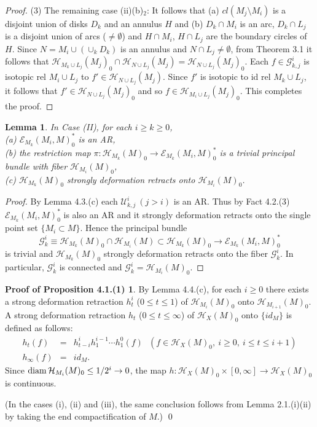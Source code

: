 \documentclass[11pt]{amsart}
\newtheorem{lemma}{Lemma}[section]
\theoremstyle{definition}
\newtheorem*{Proof of Theorem 3.1}{Proof of Theorem 3.1}
\newtheorem*{Proof of Corollary 3.1}{Proof of Corollary 3.1}
\newtheorem*{Proof of Proposition 4.1.(1)}{Proof of Proposition 4.1.(1)}
\newtheorem*{Proof of Proposition 4.1.(2)}{Proof of Proposition 4.1.(2)}
\newtheorem*{Proof of Corollary 1.1}{Proof of Corollary 1.1}
\def \cal {\mathcal}
\begin{document}
\begin{proof}
(3) The remaining case (ii)(b)$_2$: 
It follows that (a) $cl(M_j \setminus M_i)$ is a disjoint union of disks $D_k$ and an annulus $H$ and (b) $D_k \cap M_i$ is an arc, $D_k \cap L_j$ is a disjoint union of arcs ($\neq \emptyset$) and $H \cap M_i$, $H \cap L_j$ are the boundary circles of $H$. Since $N = M_i \cup (\cup_k D_k)$ is an annulus and $N \cap L_j \neq \emptyset$, from Theorem 3.1 it follows that ${\cal H}_{M_k \cup L_j}(M_j)_0 \cap {\cal H}_{N \cup L_j}(M_j) = {\cal H}_{N \cup L_j}(M_j)_0$. Each $f \in {\cal G}^i_{k,j}$ is isotopic rel $M_i \cup L_j$ to $f' \in {\cal H}_{N \cup L_j}(M_j)$. Since $f'$ is isotopic to id rel $M_k \cup L_j$, it follows that $f' \in {\cal H}_{N \cup L_j}(M_j)_0$ and so $f \in {\cal H}_{M_i \cup L_j}(M_j)_0$. This completes the proof.
\end{proof}

\begin{lemma}
In Case {\rm (II)}, for each $i \geq k \geq 0$, \\
{\rm (a)} ${\cal E}_{M_k}(M_i, M)^{\ast}_0$ is an AR, \\ 
{\rm (b)} the restriction map 
$\pi : {\cal H}_{M_k}(M)_0 \longrightarrow {\cal E}_{M_k}(M_i, M)^{\ast}_0$ 
is a trivial principal bundle with fiber ${\cal H}_{M_i}(M)_0$, \\
{\rm (c)} ${\cal H}_{M_k}(M)_0$ strongly deformation retracts onto ${\cal H}_{M_i}(M)_0$. 
\end{lemma}

\begin{proof}
By Lemma 4.3.(c) each ${\cal U}^i_{k,j} \ (j > i)$ is an AR. Thus by Fact 4.2.(3) ${\cal E}_{M_k}(M_i, M)^{\ast}_0$ is also an AR and it strongly deformation retracts onto the single point set $\{ M_i \subset M \}$. Hence the principal bundle 
\[ {\cal G}_k^i \equiv {\cal H}_{M_k}(M)_0 \cap {\cal H}_{M_i}(M) \subset {\cal H}_{M_k}(M)_0 \longrightarrow {\cal E}_{M_k}(M_i, M)^{\ast}_0 \] 
is trivial and ${\cal H}_{M_k}(M)_0$ strongly deformation retracts onto the fiber ${\cal G}_k^i$. In particular, ${\cal G}_k^i$ is connected and ${\cal G}_k^i = {\cal H}_{M_i}(M)_0$.
\end{proof}

\begin{Proof of Proposition 4.1.(1)} 
By Lemma 4.4.(c), for each $i \geq 0$ there exists a strong deformation retraction $h^i_t$ ($0 \leq t \leq 1$) of ${\cal H}_{M_i}(M)_0$ onto ${\cal H}_{M_{i+1}}(M)_0$. A strong deformation retraction $h_t$ ($0 \leq t \leq \infty$) of ${\cal H}_X(M)_0$ onto $\{ id_M \}$ is defined as follows:
\begin{eqnarray*}
 h_t(f) \, &=& h_{t-i}^ih_1^{i-1} \cdots h_1^0(f) \ \ \ (f \in {\cal H}_X(M)_0, \ i \geq 0, \ i \leq t \leq i+1) \\
 h_\infty(f) &=& id_M.
\end{eqnarray*}
Since ${\rm diam} \, {\cal H}_{M_i}(M)_0 \leq 1/2^i \to 0$, the map $h : {\cal H}_X(M)_0 \times [0, \infty] \to {\cal H}_X(M)_0$ is continuous. 

(In the cases (i), (ii) and (iii), the same conclusion follows from Lemma 2.1.(i)(ii) by taking the end compactification of $M$.) \qed
\end{Proof of Proposition 4.1.(1)} 
\end{document}
